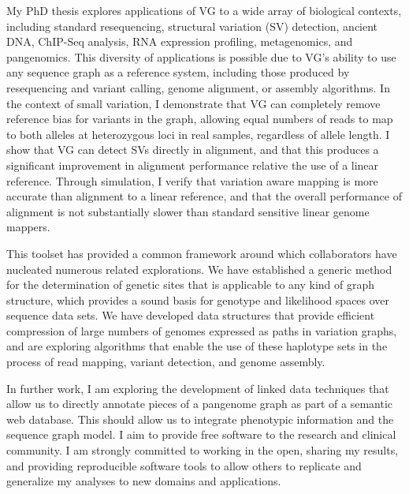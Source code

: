 \documentclass{nihbiosketch}
\newcommand{\hijournal}[1]{{\bf {\uline{#1}}}}
\begin{document}
\begin{enumerate}
My PhD thesis explores applications of VG to a wide array of biological contexts, including standard resequencing, structural variation (SV) detection, ancient DNA, ChIP-Seq analysis, RNA expression profiling, metagenomics, and pangenomics. This diversity of applications is possible due to VG’s ability to use any sequence graph as a reference system, including those produced by resequencing and variant calling, genome alignment, or assembly algorithms. In the context of small variation, I demonstrate that VG can completely remove reference bias for variants in the graph, allowing equal numbers of reads to map to both alleles at heterozygous loci in real samples, regardless of allele length. I show that VG can detect SVs directly in alignment, and that this produces a significant improvement in alignment performance relative the use of a linear reference. Through simulation, I verify that variation aware mapping is more accurate than alignment to a linear reference, and that the overall performance of alignment is not substantially slower than standard sensitive linear genome mappers.

This toolset has provided a common framework around which collaborators have nucleated numerous related explorations. We have established a generic method for the determination of genetic sites that is applicable to any kind of graph structure, which provides a sound basis for genotype and likelihood spaces over sequence data sets. We have developed data structures that provide efficient compression of large numbers of genomes expressed as paths in variation graphs, and are exploring algorithms that enable the use of these haplotype sets in the process of read mapping, variant detection, and genome assembly.

In further work, I am exploring the development of linked data techniques that allow us to directly annotate pieces of a pangenome graph as part of a semantic web database. This should allow us to integrate phenotypic information and the sequence graph model. I aim to provide free software to the research and clinical community. I am strongly committed to working in the open, sharing my results, and providing reproducible software tools to allow others to replicate and generalize my analyses to new domains and applications.

  \begin{enumerate} %



\end{enumerate}
\end{enumerate}
\end{document}
